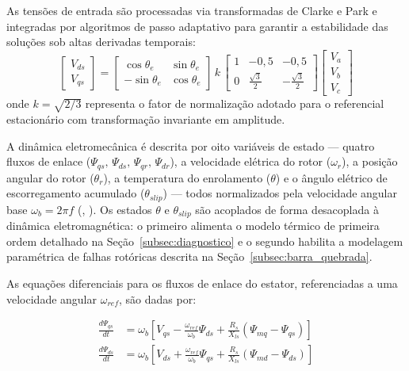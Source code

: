 \documentclass[a4paper]{ifacconf}
\begin{document}
As tensões de entrada são processadas via transformadas de Clarke e Park e integradas por algoritmos de passo adaptativo para garantir a estabilidade das soluções sob altas derivadas temporais:
\begin{equation}
\label{eq:park}
\begin{bmatrix}V_{ds} \\ V_{qs}\end{bmatrix} = \begin{bmatrix}\cos\theta_e & \sin\theta_e \\ -\sin\theta_e & \cos\theta_e\end{bmatrix} \,k\, \begin{bmatrix}1 & -0,5 & -0,5 \\ 0 & \frac{\sqrt{3}}{2} & -\frac{\sqrt{3}}{2}\end{bmatrix} \begin{bmatrix}V_a \\ V_b \\ V_c\end{bmatrix}
\end{equation}
onde $k = \sqrt{2/3}$ representa o fator de normalização adotado para o referencial estacionário com transformação invariante em amplitude.

A dinâmica eletromecânica é descrita por oito variáveis de estado --- quatro fluxos de enlace ($\Psi_{qs},\,\Psi_{ds},\,\Psi_{qr},\,\Psi_{dr}$), a velocidade elétrica do rotor ($\omega_r$), a posição angular do rotor ($\theta_r$), a temperatura do enrolamento ($\theta$) e o ângulo elétrico de escorregamento acumulado ($\theta_{slip}$) --- todos normalizados pela velocidade angular base $\omega_b = 2\pi f$ (\citeauthor{usta2024mathematical}, \citeyear{usta2024mathematical}). Os estados $\theta$ e $\theta_{slip}$ são acoplados de forma desacoplada à dinâmica eletromagnética: o primeiro alimenta o modelo térmico de primeira ordem detalhado na Seção~\ref{subsec:diagnostico} e o segundo habilita a modelagem paramétrica de falhas rotóricas descrita na Seção~\ref{subsec:barra_quebrada}.

As equações diferenciais para os fluxos de enlace do estator, referenciadas a uma velocidade angular $\omega_{ref}$, são dadas por:

\begin{align}
\frac{d\Psi_{qs}}{dt} &= \omega_b \left[V_{qs} - \frac{\omega_{ref}}{\omega_b}\Psi_{ds} + \frac{R_s}{X_{ls}}(\Psi_{mq} - \Psi_{qs})\right] \label{eq:dPsiqs} \\[4pt]
\frac{d\Psi_{ds}}{dt} &= \omega_b \left[V_{ds} + \frac{\omega_{ref}}{\omega_b}\Psi_{qs} + \frac{R_s}{X_{ls}}(\Psi_{md} - \Psi_{ds})\right] \label{eq:dPsids}
\end{align}
\end{document}
